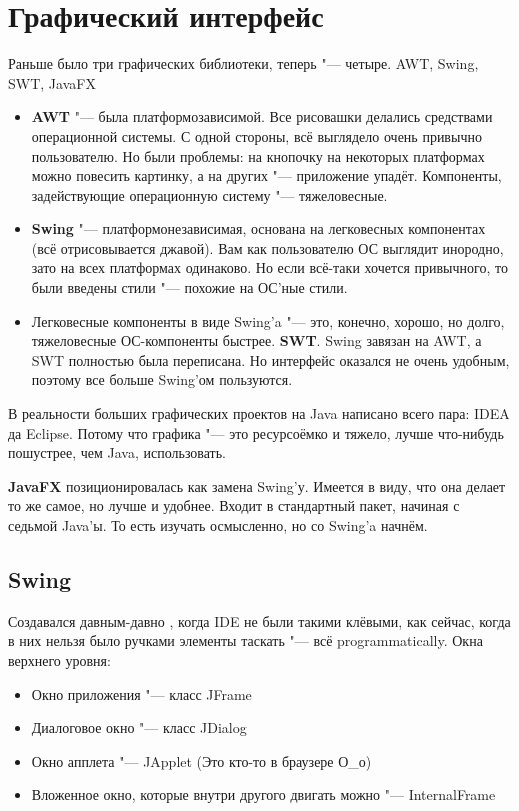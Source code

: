 \chapter{Графический интерфейс}
Раньше было три графических библиотеки, теперь "--- четыре.
AWT, Swing, SWT, JavaFX
\begin{itemize}
\item
	\textbf{AWT} "--- была платформозависимой.
	Все рисовашки делались средствами операционной системы.
	С одной стороны, всё выглядело очень привычно пользователю.
	Но были проблемы: на кнопочку на некоторых платформах можно повесить картинку, а на других "--- приложение упадёт.
	Компоненты, задействующие операционную систему "--- тяжеловесные.
\item
	\textbf{Swing} "--- платформонезависимая, основана на легковесных компонентах (всё отрисовывается джавой).
	Вам как пользователю ОС выглядит инородно, зато на всех платформах одинаково.
	Но если всё-таки хочется привычного, то были введены стили "--- похожие на ОС'ные стили.
\item
	Легковесные компоненты в виде Swing'a "--- это, конечно, хорошо, но долго, тяжеловесные ОС-компоненты быстрее.
	\textbf{SWT}. Swing завязан на AWT, а SWT полностью была переписана.
	Но интерфейс оказался не очень удобным, поэтому все больше Swing'ом пользуются.
\end{itemize}

В реальности больших графических проектов на Java написано всего пара: IDEA да Eclipse.
Потому что графика "--- это ресурсоёмко и тяжело, лучше что-нибудь пошустрее, чем Java, использовать.

\textbf{JavaFX} позиционировалась как замена Swing'у.
Имеется в виду, что она делает то же самое, но лучше и удобнее.
Входит в стандартный пакет, начиная с седьмой Java'ы. 
То есть изучать осмысленно, но со Swing'a начнём.

\section{Swing}
Создавался давным-давно%
, когда IDE не были такими клёвыми, как сейчас, когда в них нельзя было ручками элементы таскать "--- всё programmatically.
Окна верхнего уровня:
\begin{itemize}
\item
	Окно приложения "--- класс JFrame
\item
	Диалоговое окно "--- класс JDialog
\item
	Окно апплета "--- JApplet (Это кто-то в браузере О\_о)
\item
	Вложенное окно, которые внутри другого двигать можно "--- InternalFrame
\end{itemize}

